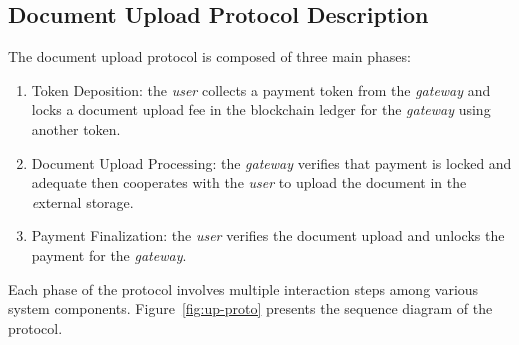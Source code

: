 \subsection{Document Upload Protocol Description}
The document upload protocol is composed of three main phases:
\begin{enumerate}
\item Token Deposition: the {\it user} collects a payment token from the {\it gateway} and locks a document upload fee in the blockchain ledger for the {\it gateway} using another token.
\item Document Upload Processing: the {\it gateway} verifies that payment is locked and adequate then cooperates with the \textit{user} to upload the document in the {\textit external storage}.
\item Payment Finalization: the {\it user} verifies the document upload and unlocks the payment for the {\it gateway}.
\end{enumerate}
Each phase of the protocol involves multiple interaction steps among various system components. Figure~\ref{fig:up-proto} presents the sequence diagram of the protocol.
